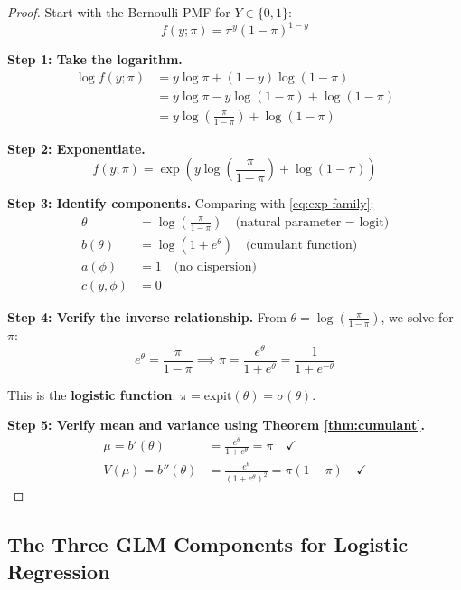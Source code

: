 \documentclass[11pt,letterpaper]{article}
\theoremstyle{definition}
\newcommand{\expit}{\mathrm{expit}}
\begin{document}
\begin{proof}
Start with the Bernoulli PMF for $Y \in \{0, 1\}$:
\begin{equation}
    f(y; \pi) = \pi^y (1-\pi)^{1-y}
\end{equation}

\textbf{Step 1: Take the logarithm.}
\begin{align}
    \log f(y; \pi) &= y \log \pi + (1-y) \log(1-\pi) \\
    &= y \log \pi - y \log(1-\pi) + \log(1-\pi) \\
    &= y \log\left(\frac{\pi}{1-\pi}\right) + \log(1-\pi)
\end{align}

\textbf{Step 2: Exponentiate.}
\begin{equation}
    f(y; \pi) = \exp\left( y \log\left(\frac{\pi}{1-\pi}\right) + \log(1-\pi) \right)
\end{equation}

\textbf{Step 3: Identify components.} Comparing with \eqref{eq:exp-family}:
\begin{align}
    \theta &= \log\left(\frac{\pi}{1-\pi}\right) \quad \text{(natural parameter = logit)} \\
    b(\theta) &= \log(1 + e^\theta) \quad \text{(cumulant function)} \\
    a(\phi) &= 1 \quad \text{(no dispersion)} \\
    c(y, \phi) &= 0
\end{align}

\textbf{Step 4: Verify the inverse relationship.}
From $\theta = \log\left(\frac{\pi}{1-\pi}\right)$, we solve for $\pi$:
\begin{equation}
    e^\theta = \frac{\pi}{1-\pi} \implies \pi = \frac{e^\theta}{1 + e^\theta} = \frac{1}{1 + e^{-\theta}}
\end{equation}

This is the \textbf{logistic function}: $\pi = \expit(\theta) = \sigma(\theta)$.

\textbf{Step 5: Verify mean and variance using Theorem \ref{thm:cumulant}.}
\begin{align}
    \mu = b'(\theta) &= \frac{e^\theta}{1 + e^\theta} = \pi \quad \checkmark \\
    V(\mu) = b''(\theta) &= \frac{e^\theta}{(1+e^\theta)^2} = \pi(1-\pi) \quad \checkmark
\end{align}
\end{proof}

\subsection{The Three GLM Components for Logistic Regression}
\end{document}
